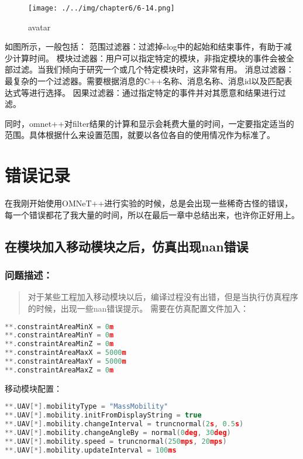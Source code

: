 \begin{figure}[htbp]
\centering
\texttt{[image: ./../img/chapter6/6-14.png]}
\caption{avatar}
\end{figure}

如图所示，一般包括：
范围过滤器：过滤掉elog中的起始和结束事件，有助于减少计算时间。
模块过滤器：用户可以指定特定的模块，非指定模块的事件会被全部过滤。当我们倾向于研究一个或几个特定模块时，这非常有用。
消息过滤器：最复杂的一个过滤器。需要根据消息的C++名称、消息名称、消息id以及匹配表达式等进行选择。
因果过滤器：通过指定特定的事件并对其愿意和结果进行过滤。

同时，omnet++对filter结果的计算和显示会耗费大量的时间，一定要指定适当的范围。具体根据什么来设置范围，就要以各位各自的使用情况作为标准了。

\chapter{错误记录}
\label{错误记录}

在我刚开始使用OMNeT++进行实验的时候，总是会出现一些稀奇古怪的错误，每一个错误都花了我大量的时间，所以在最后一章中总结出来，也许你正好用上。

\section{在模块加入移动模块之后，仿真出现nan错误}
\label{在模块加入移动模块之后，仿真出现nan错误}

\subsection{问题描述：}
\label{问题描述：}

\begin{quote}
对于某些工程加入移动模块以后，编译过程没有出错，但是当执行仿真程序的时候，出现一些nan错误提示。
需要在仿真配置文件加入：
\end{quote}

\begin{lstlisting}[language=c]
**.constraintAreaMinX = 0m
**.constraintAreaMinY = 0m
**.constraintAreaMinZ = 0m
**.constraintAreaMaxX = 5000m
**.constraintAreaMaxY = 5000m
**.constraintAreaMaxZ = 0m

\end{lstlisting}

移动模块配置：

\begin{lstlisting}[language=c]
**.UAV[*].mobilityType = "MassMobility"
**.UAV[*].mobility.initFromDisplayString = true
**.UAV[*].mobility.changeInterval = truncnormal(2s, 0.5s)
**.UAV[*].mobility.changeAngleBy = normal(0deg, 30deg)
**.UAV[*].mobility.speed = truncnormal(250mps, 20mps)
**.UAV[*].mobility.updateInterval = 100ms

\end{lstlisting}

